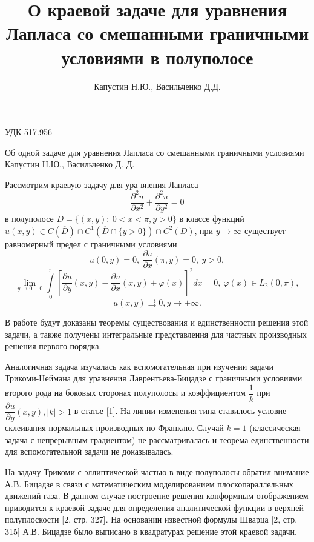 \documentclass[a4paper, 9pt]{article}
\title{О краевой задаче для уравнения Лапласа со смешанными граничными условиями в полуполосе}
\author{Капустин Н.Ю., Васильченко Д.Д.}
\date{}
\begin{document}
	УДК 517.956
	\begin{center}		
		\LARGE{
		 Об одной задаче для уравнения Лапласа со смешанными граничными условиями
		}
		\newline
		\large{Капустин Н.Ю., Васильченко Д. Д.}
		
	\end{center}
	\par
	Рассмотрим краевую задачу для ура внения Лапласа
	\begin{equation}
		\dfrac{\partial^2 u}{\partial x^2} +\dfrac{\partial^2 u}{\partial y^2} = 0
	\end{equation}
	в полуполосе $D = \{(x,y) :\  0 < x < \pi, y > 0\}$	в классе функций $u(x,y) \in C(\overline{D}) \cap C^1(\overline{D} \cap \{y > 0\}) \cap C^2 (D)$,  при $y \to \infty$ существует равномерный предел \newline
	с граничными условиями
	\begin{equation}
		u(0, y) = 0, \ \dfrac{\partial u}{\partial x} (\pi, y) = 0, \ y > 0, 
	\end{equation}
	\begin{equation}
		\lim\limits_{y \to 0 + 0} \int\limits_0^\pi \left[\dfrac{\partial u}{\partial y}(x,y) - \dfrac{\partial u}{\partial x}(x,y) + \varphi(x) \right]^2 dx = 0, \ \varphi(x) \in L_2(0,\pi) , 
	\end{equation}
	\begin{equation}
		u(x,y) \rightrightarrows 0, y \to +\infty. 
	\end{equation}
	
	В работе будут доказаны теоремы существования и единственности решения
	этой задачи, а также получены интегральные представления для частных
	производных решения первого порядка.
	
	Аналогичная задача изучалась как вспомогательная при изучении задачи Трикоми-Неймана
	для уравнения Лаврентьева-Бицадзе с граничными условиями второго рода на боковых сторонах
	полуполосы и коэффициентом $\dfrac{1}{k}$ при
	$\dfrac{\partial u}{\partial y}(x,y), \vert k\vert>1 $ в статье [1].
	На линии изменения типа ставилось условие склеивания нормальных производных
	по Франклю. Случай $k=1$ (классическая задача с непрерывным градиентом)
	не рассматривалась и теорема единственности для вспомогательной задачи
	не доказывалась.
	
	На задачу Трикоми с эллиптической частью в виде полуполосы обратил внимание
	А.В. Бицадзе в связи с математическим моделированием плоскопараллельных
	движений газа. В данном случае построение решения конформным отображением
	приводится к краевой задаче для определения аналитической функции в верхней
	полуплоскости [2, стр. 327]. На основании известной формулы Шварца [2, стр. 315]
	А.В. Бицадзе было выписано в квадратурах решение этой краевой задачи. 
	
\end{document}
